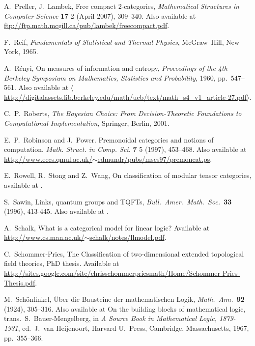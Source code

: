 \documentclass[12pt,twoside,openright]{report}
\begin{document}
\begin{thebibliography}{99}
 A.\ Preller, J.\ Lambek, Free compact 2-categories, \textsl{Mathematical Structures in Computer Science} \textbf{17} 2 (April 2007), 309--340.  Also available at \href{ftp://ftp.math.mcgill.ca/pub/lambek/freecompact.pdf}{ftp://ftp.math.mcgill.ca/pub/lambek/freecompact.pdf}.

 F.\ Reif, {\sl Fundamentals of Statistical and Thermal Physics}, McGraw--Hill, New York, 1965.

 A.\ R\'enyi, On measures of information and entropy,
\textsl{Proceedings of the 4th Berkeley Symposium on Mathematics, Statistics and Probability}, 1960, pp.\ 547--561.  Also available at
\href{http://digitalassets.lib.berkeley.edu/math/ucb/text/math_s4_v1_article-27.pdf}
{$\langle$http://digitalassets.lib.berkeley.edu/math/ucb/text/math\_s4\_v1\_article-27.pdf$\rangle$}.

 C.\ P.\ Roberts, 
{\sl The Bayesian Choice: From Decision-Theoretic Foundations to Computational Implementation}, Springer, Berlin, 2001.

 E.\ P.\ Robinson and J.\ Power. Premonoidal categories and notions of computation. \textsl{Math. Struct. in Comp. Sci.} \textbf{7} 5 (1997), 453--468.  Also available at \href{http://www.eecs.qmul.ac.uk/~edmundr/pubs/mscs97/premoncat.ps}{http://www.eecs.qmul.ac.uk/$\sim$edmundr/pubs/mscs97/premoncat.ps}.

 E.\ Rowell, R.\ Stong and Z.\ Wang, On classification of modular tensor categories, available at .

 S.\ Sawin, Links, quantum groups and TQFTs,
{\sl Bull.\ Amer.\ Math.\ Soc.\ }{\bf 33} (1996), 413-445. Also available at .

 A.\ Schalk, What is a categorical model for linear logic?  Available at \hfill \break
\href{http://www.cs.man.ac.uk/~schalk/notes/llmodel.pdf}
{http://www.cs.man.ac.uk/$\sim$schalk/notes/llmodel.pdf}.

 C.\ Schommer-Pries, The Classification of two-dimensional extended topological field theories, PhD thesis. Available at
\href{http://sites.google.com/site/chrisschommerpriesmath/Home/Schommer-Pries-Thesis.pdf}{http://sites.google.com/site/chrisschommerpriesmath/Home/Schommer-Pries-Thesis.pdf}.

 M.\ Sch\"onfinkel, \"Uber die Bausteine der mathematischen Logik, {\sl Math.\ Ann.\ }{\bf 92} (1924), 305--316. Also available at On the building blocks of mathematical logic, trans.\ S.\ Bauer-Mengelberg, in {\sl A Source Book in Mathematical Logic, 1879-1931}, ed.\ J.\ van Heijenoort, Harvard U.\ Press, Cambridge, Massachusetts, 1967, pp.\ 355--366.


\end{thebibliography}
\end{document}
